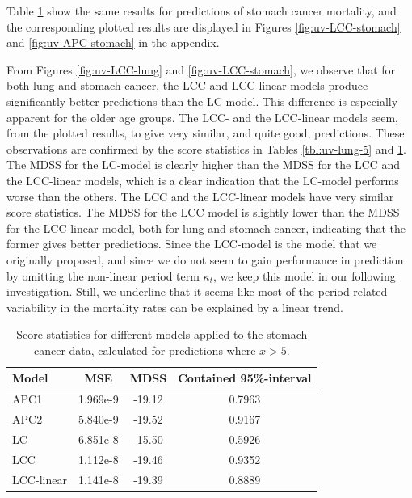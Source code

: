 \newpar Table \ref{tbl:uv-stomach-5} show the same results for predictions of stomach cancer mortality, and the corresponding plotted results are displayed in Figures \ref{fig:uv-LCC-stomach} and \ref{fig:uv-APC-stomach} in the appendix. 

\newpar From Figures \ref{fig:uv-LCC-lung} and \ref{fig:uv-LCC-stomach}, we observe that for both lung and stomach cancer, the LCC and LCC-linear models produce significantly better predictions than the LC-model. This difference is especially apparent for the older age groups. The LCC- and the LCC-linear models seem, from the plotted results, to give very similar, and quite good, predictions. These observations are confirmed by the score statistics in Tables \ref{tbl:uv-lung-5} and \ref{tbl:uv-stomach-5}. The MDSS for the LC-model is clearly higher than the MDSS for the LCC and the LCC-linear models, which is a clear indication that the LC-model performs worse than the others. The LCC and the LCC-linear models have very similar score statistics. The MDSS for the LCC model is slightly lower than the MDSS for the LCC-linear model, both for lung and stomach cancer, indicating that the former gives better predictions. Since the LCC-model is the model that we originally proposed, and since we do not seem to gain performance in prediction by omitting the non-linear period term $\kappa_t$, we keep this model in our following investigation. Still, we underline that it seems like most of the period-related variability in the mortality rates can be explained by a linear trend.

\begin{table}
    \begin{center}
        \begin{tabular}{l |c c c }
            Model & MSE &   MDSS & Contained 95\%-interval\\
            \hline
            APC1     & 1.969e-9 & -19.12    & 0.7963 \\
            APC2     & 5.840e-9 & -19.52    & 0.9167 \\
            LC      & 6.851e-8 & -15.50    & 0.5926 \\
            LCC     & 1.112e-8 & -19.46    & 0.9352 \\
            LCC-linear      & 1.141e-8 & -19.39    & 0.8889
        \end{tabular}
        \caption{Score statistics for different models applied to the stomach cancer data, calculated for predictions where $x > 5$.}\label{tbl:uv-stomach-5}
    \end{center}
\end{table}

